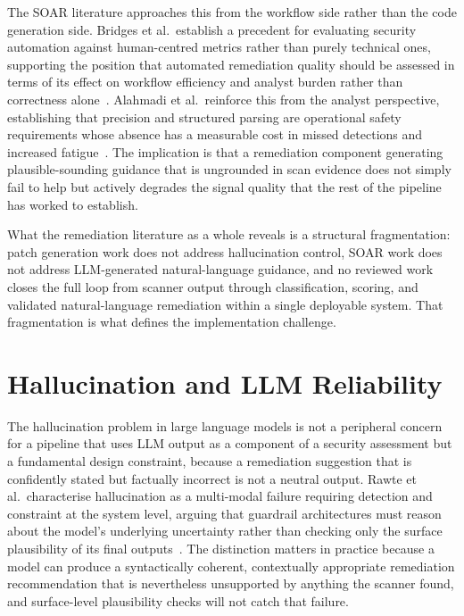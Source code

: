 \documentclass[12pt, a4paper, oneside]{report}
\begin{document}
The SOAR literature approaches this from the workflow side rather than
the code generation side. Bridges et al.\ establish a precedent for
evaluating security automation against human-centred metrics rather than
purely technical ones, supporting the position that automated
remediation quality should be assessed in terms of its effect on
workflow efficiency and analyst burden rather than correctness
alone~\cite{bridges2023}. Alahmadi et al.\ reinforce this from the
analyst perspective, establishing that precision and structured parsing
are operational safety requirements whose absence has a measurable cost
in missed detections and increased fatigue~\cite{alahmadi2022}. The
implication is that a remediation component generating plausible-sounding
guidance that is ungrounded in scan evidence does not simply fail to
help but actively degrades the signal quality that the rest of the
pipeline has worked to establish.

What the remediation literature as a whole reveals is a structural
fragmentation: patch generation work does not address hallucination
control, SOAR work does not address LLM-generated natural-language
guidance, and no reviewed work closes the full loop from scanner output
through classification, scoring, and validated natural-language
remediation within a single deployable system. That fragmentation is
what defines the implementation challenge.

\section{Hallucination and LLM Reliability}

The hallucination problem in large language models is not a peripheral
concern for a pipeline that uses LLM output as a component of a security
assessment but a fundamental design constraint, because a remediation
suggestion that is confidently stated but factually incorrect is not a
neutral output. Rawte et al.\ characterise hallucination as a
multi-modal failure requiring detection and constraint at the system
level, arguing that guardrail architectures must reason about the
model's underlying uncertainty rather than checking only the surface
plausibility of its final outputs~\cite{rawte2023}. The distinction
matters in practice because a model can produce a syntactically
coherent, contextually appropriate remediation recommendation that is
nevertheless unsupported by anything the scanner found, and
surface-level plausibility checks will not catch that failure.
\end{document}
